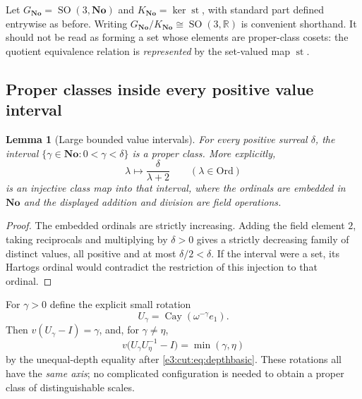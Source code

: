 \documentclass[11pt,letterpaper]{article}
\numberwithin{equation}{section}
\newtheorem{lemma}[lemma]{Lemma}
\theoremstyle{definition}
\theoremstyle{remark}
\newcommand{\No}{\mathbf{No}}
\newcommand{\R}{\mathbb R}
\newcommand{\st}{\operatorname{st}}
\newcommand{\SO}{\operatorname{SO}}
\newcommand{\cay}{\operatorname{Cay}}
\newcommand{\Ord}{\mathrm{Ord}}
\begin{document}
Let $G_{\No}=\SO(3,\No)$ and $K_{\No}=\ker\st$, with standard part defined
entrywise as before. Writing $G_{\No}/K_{\No}\cong\SO(3,\R)$ is convenient
shorthand. It should not be read as forming a set whose elements are
proper-class cosets: the quotient equivalence relation is \emph{represented} by
the set-valued map $\st$.

\subsection{Proper classes inside every positive value interval}

\begin{lemma}[Large bounded value intervals]\label{e3:cut:lem:largeinterval}
For every positive surreal $\delta$, the interval
$\{\gamma\in\No:0<\gamma<\delta\}$ is a proper class. More explicitly,
\begin{equation}\label{e3:cut:eq:ordinalinjection}
 \lambda\longmapsto\frac{\delta}{\lambda+2}\qquad(\lambda\in\Ord)
\end{equation}
is an injective class map into that interval, where the ordinals are embedded in
$\No$ and the displayed addition and division are field operations.
\end{lemma}
\begin{proof}
The embedded ordinals are strictly increasing. Adding the field element $2$,
taking reciprocals and multiplying by $\delta>0$ gives a strictly decreasing
family of distinct values, all positive and at most $\delta/2<\delta$. If the
interval were a set, its Hartogs ordinal would contradict the restriction of
this injection to that ordinal.
\end{proof}

For $\gamma>0$ define the explicit small rotation
\begin{equation}\label{e3:cut:eq:ugamma}
 U_\gamma=\cay(\omega^{-\gamma}e_1).
\end{equation}
Then $v(U_\gamma-I)=\gamma$, and, for $\gamma\ne\eta$,
\begin{equation}\label{e3:cut:eq:separation}
 v\bigl(U_\gamma U_\eta^{-1}-I\bigr)=\min(\gamma,\eta)
\end{equation}
by the unequal-depth equality after \cref{e3:cut:eq:depthbasic}. These rotations
all have the \emph{same axis}; no complicated configuration is needed to obtain
a proper class of distinguishable scales.
\end{document}
